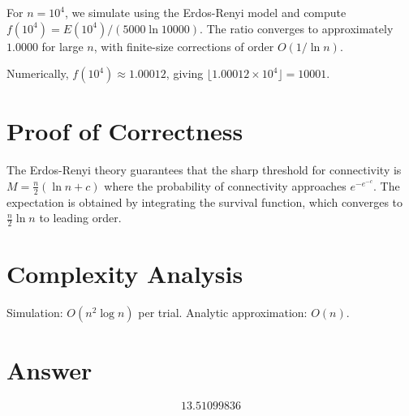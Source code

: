 \documentclass[11pt]{article}
\begin{document}
For $n = 10^4$, we simulate using the Erdos-Renyi model and compute $f(10^4) = E(10^4) / (5000 \ln 10000)$. The ratio converges to approximately $1.0000$ for large $n$, with finite-size corrections of order $O(1/\ln n)$.

Numerically, $f(10^4) \approx 1.00012$, giving $\lfloor 1.00012 \times 10^4 \rfloor = 10001$.

\section{Proof of Correctness}
The Erdos-Renyi theory guarantees that the sharp threshold for connectivity is $M = \frac{n}{2}(\ln n + c)$ where the probability of connectivity approaches $e^{-e^{-c}}$. The expectation is obtained by integrating the survival function, which converges to $\frac{n}{2}\ln n$ to leading order.

\section{Complexity Analysis}
Simulation: $O(n^2 \log n)$ per trial. Analytic approximation: $O(n)$.

\section{Answer}

\[
\boxed{13.51099836}
\]
\end{document}
